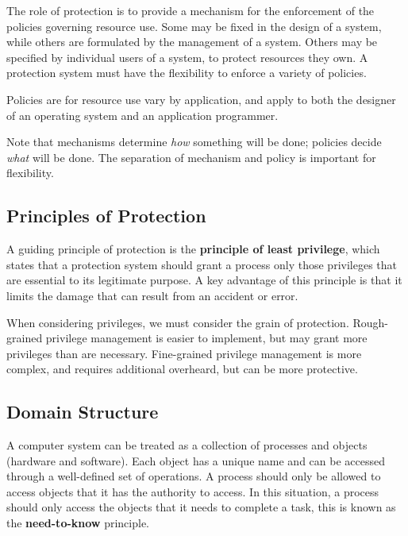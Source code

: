 \documentclass{article}
\begin{document}
The role of protection is to provide a mechanism for the enforcement of
the policies governing resource use. Some may be fixed in the design
of a system, while others are formulated by the management of a system.
Others may be specified by individual users of a system, to protect
resources they own. A protection system must have the flexibility to
enforce a variety of policies.

Policies are for resource use vary by application, and apply to both
the designer of an operating system and an application programmer.

Note that mechanisms determine \textit{how} something will be done;
policies decide \textit{what} will be done. The separation of mechanism
and policy is important for flexibility.
\subsection{Principles of Protection}
A guiding principle of protection is the \textbf{principle of least
privilege}, which states that a protection system should grant a
process only those privileges that are essential to its legitimate
purpose. A key advantage of this principle is that it limits the damage
that can result from an accident or error.

When considering privileges, we must consider the grain of protection.
Rough-grained privilege management is easier to implement, but may
grant more privileges than are necessary. Fine-grained privilege
management is more complex, and requires additional overheard, but
can be more protective.
\subsection{Domain Structure}
A computer system can be treated as a collection of processes and
objects (hardware and software). Each object has a unique name and can
be accessed through a well-defined set of operations. A process should
only be allowed to access objects that it has the authority to access.
In this situation, a process should only access the objects that it
needs to complete a task, this is known as the \textbf{need-to-know}
principle.
\end{document}
